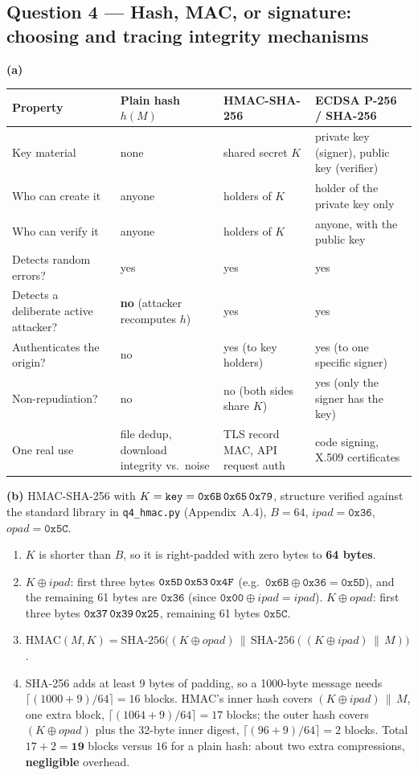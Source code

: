 \documentclass[11pt,a4paper]{article}
\begin{document}
\subsection*{Question 4 --- Hash, MAC, or signature: choosing and tracing integrity mechanisms}
\textbf{(a)}
\begin{table}[H]
\centering\small
\begin{tabularx}{\textwidth}{@{}P{4.2cm}LLL@{}}
\toprule
Property & Plain hash $h(M)$ & HMAC-SHA-256 & ECDSA P-256 / SHA-256 \\
\midrule
Key material & none & shared secret $K$ & private key (signer), public key (verifier) \\
Who can create it & anyone & holders of $K$ & holder of the private key only \\
Who can verify it & anyone & holders of $K$ & anyone, with the public key \\
Detects random errors? & yes & yes & yes \\
Detects a deliberate active attacker? & \textbf{no} (attacker recomputes $h$) & yes & yes \\
Authenticates the origin? & no & yes (to key holders) & yes (to one specific signer) \\
Non-repudiation? & no & no (both sides share $K$) & yes (only the signer has the key) \\
One real use & file dedup, download integrity vs.\ noise & TLS record MAC, API request auth & code signing, X.509 certificates \\
\bottomrule
\end{tabularx}
\end{table}

\textbf{(b)} HMAC-SHA-256 with $K=\texttt{key}=\texttt{0x6B\,0x65\,0x79}$, structure verified against the
standard library in \texttt{q4\_hmac.py} (Appendix~A.4), $B=64$, $ipad=\texttt{0x36}$, $opad=\texttt{0x5C}$.
\begin{enumerate}[label=(\roman*)]
\item $K$ is shorter than $B$, so it is right-padded with zero bytes to \textbf{64 bytes}.
\item $K\oplus ipad$: first three bytes $\texttt{0x5D\,0x53\,0x4F}$ (e.g.\ $\texttt{0x6B}\oplus\texttt{0x36}
=\texttt{0x5D}$), and the remaining 61 bytes are $\texttt{0x36}$ (since $\texttt{0x00}\oplus
ipad=ipad$). $K\oplus opad$: first three bytes $\texttt{0x37\,0x39\,0x25}$, remaining 61 bytes
$\texttt{0x5C}$.
\item $\mathrm{HMAC}(M,K)=\mathrm{SHA\text{-}256}\big((K\oplus opad)\,\|\,\mathrm{SHA\text{-}256}((K\oplus
ipad)\,\|\,M)\big)$.
\item SHA-256 adds at least 9 bytes of padding, so a 1000-byte message needs
$\lceil(1000+9)/64\rceil=16$ blocks. HMAC's inner hash covers $(K\oplus ipad)\,\|\,M$, one extra block,
$\lceil(1064+9)/64\rceil=17$ blocks; the outer hash covers $(K\oplus opad)$ plus the 32-byte inner
digest, $\lceil(96+9)/64\rceil=2$ blocks. Total $17+2=\mathbf{19}$ blocks versus $16$ for a plain hash:
about two extra compressions, \textbf{negligible} overhead.
\end{enumerate}
\end{document}
